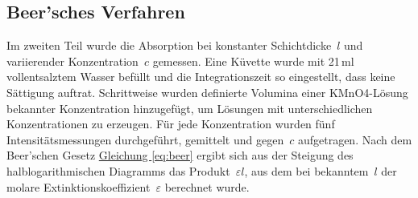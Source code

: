 \subsection{Beer'sches Verfahren}
Im zweiten Teil wurde die Absorption bei konstanter Schichtdicke~$l$ und variierender Konzentration~$c$ gemessen. Eine Küvette wurde mit 21\,ml vollentsalztem Wasser befüllt und die Integrationszeit so eingestellt, dass keine Sättigung auftrat. Schrittweise wurden definierte Volumina einer {KMnO4}-Lösung bekannter Konzentration hinzugefügt, um Lösungen mit unterschiedlichen Konzentrationen zu erzeugen. Für jede Konzentration wurden fünf Intensitätsmessungen durchgeführt, gemittelt und gegen~$c$ aufgetragen. Nach dem Beer'schen Gesetz \hyperref[eq:beer]{Gleichung \ref*{eq:beer}} ergibt sich aus der Steigung des halblogarithmischen Diagramms das Produkt~$\varepsilon l$, aus dem bei bekanntem~$l$ der molare Extinktionskoeffizient~$\varepsilon$ berechnet wurde.
